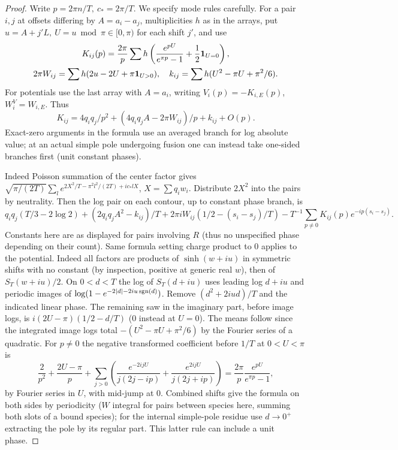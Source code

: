 \begin{proof}
Write \(p=2\pi n/T,\ c_*=2\pi/T\). We specify mode rules carefully. For a pair \(i,j\) at offsets differing by \(A=a_i-a_j\), multiplicities \(h\) as in the arrays, put \(u=A+j'L,\ U=u\bmod\pi\in[0,\pi)\) for each shift \(j'\), and use
\[
 \begin{gathered}
 K_{ij}(p)=\frac{2\pi}{p}\sum h\left(\frac{e^{pU}}{e^{\pi p}-1}+\frac12{\bf1}_{U=0}\right),\\
 2\pi W_{ij}=\sum h(2u-2U+\pi{\bf1}_{U>0}),\quad
 k_{ij}=\sum h(U^2-\pi U+\pi^2/6).
 \end{gathered}
\]
For potentials use the last array with \(A=a_i\), writing \(V_i(p)=-K_{i,E}(p)\), \(W^V_i=W_{i,E}\). Thus
\[
 K_{ij}=4q_iq_j/p^2+(4q_iq_j A-2\pi W_{ij})/p+k_{ij}+O(p).
\]
Exact-zero arguments in the formula use an averaged branch for log absolute value; at an actual simple pole undergoing fusion one can instead take one-sided branches first (unit constant phases).

Indeed Poisson summation of the center factor gives
\(\sqrt{\pi/(2T)}\sum_l e^{2X^2/T-\pi^2 l^2/(2T)+i c_*l X}\), \(X=\sum q_i w_i\). Distribute \(2X^2\) into the pairs by neutrality. Then the log pair on each contour, up to constant phase branch, is
\[
 q_iq_j(T/3-2\log2)+(2q_iq_j A^2-k_{ij})/T+
 2\pi i W_{ij}(1/2-(s_i-s_j)/T)
 -T^{-1}\sum_{p\ne0}K_{ij}(p)e^{-ip(s_i-s_j)} .
\]
Constants here are as displayed for pairs involving \(R\) (thus no unspecified phase depending on their count). Same formula setting charge product to 0 applies to the potential. Indeed all factors are products of \(\sinh(w+iu)\) in symmetric shifts with no constant (by inspection, positive at generic real \(w\)), then of \(S_T(w+iu)/2\). On \(0<d<T\) the log of \(S_T(d+iu)\) uses leading log \(d+iu\) and periodic images of \(\log(1-e^{-2|d|-2iu\,{\rm sgn}(d)})\). Remove \((d^2+2iud)/T\) and the indicated linear phase. The remaining saw in the imaginary part, before image logs, is \(i(2U-\pi)(1/2-d/T)\) (0 instead at \(U=0\)). The means follow since the integrated image logs total \(-(U^2-\pi U+\pi^2/6)\) by the Fourier series of a quadratic. For \(p\ne0\) the negative transformed coefficient before \(1/T\) at \(0<U<\pi\) is
\[
 \frac{2}{p^2}+\frac{2U-\pi}{p}
 +\sum_{j>0}\left(\frac{e^{-2ijU}}{j(2j-ip)}+\frac{e^{2ijU}}{j(2j+ip)}\right)
 =\frac{2\pi}{p}\frac{e^{pU}}{e^{\pi p}-1},
\]
by Fourier series in \(U\), with mid-jump at 0. Combined shifts give the formula on both sides by periodicity (\(W\) integral for pairs between species here, summing both slots of a bound species); for the internal simple-pole residue use \(d\to0^+\) extracting the pole by its regular part. This latter rule can include a unit phase.


\end{proof}
